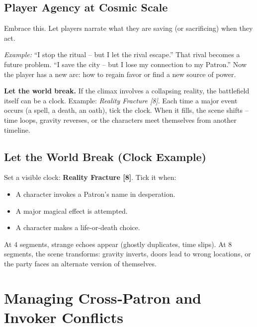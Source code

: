 \subsection*{Player Agency at Cosmic Scale}
\begin{tcolorbox}[
  colback=green!5!white,
  colframe=green!75!black,
  title=At Tier V, Every Choice May Erase an Alternative Timeline,
  fonttitle=\bfseries
]
Embrace this. Let players narrate what they are saving (or sacrificing) when they act.

\medskip
\noindent\textit{Example:} “I stop the ritual – but I let the rival escape.” That rival becomes a future problem. “I save the city – but I lose my connection to my Patron.” Now the player has a new arc: how to regain favor or find a new source of power.

\medskip
\noindent\textbf{Let the world break.} If the climax involves a collapsing reality, the battlefield itself can be a clock. Example: \emph{Reality Fracture [8]}. Each time a major event occurs (a spell, a death, an oath), tick the clock. When it fills, the scene shifts – time loops, gravity reverses, or the characters meet themselves from another timeline.
\end{tcolorbox}

\subsection*{Let the World Break (Clock Example)}
Set a visible clock: \textbf{Reality Fracture [8]}. Tick it when:
\begin{itemize}
  \item A character invokes a Patron’s name in desperation.
  \item A major magical effect is attempted.
  \item A character makes a life‑or‑death choice.
\end{itemize}
At 4 segments, strange echoes appear (ghostly duplicates, time slips). At 8 segments, the scene transforms: gravity inverts, doors lead to wrong locations, or the party faces an alternate version of themselves.

\section{Managing Cross‑Patron and Invoker Conflicts}

